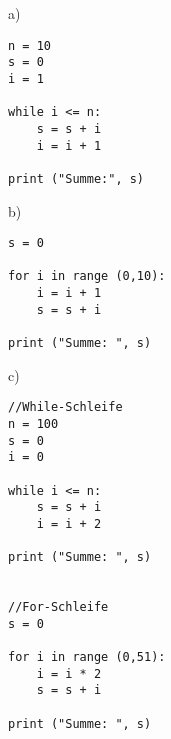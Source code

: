 a) \begin{lstlisting}[label=KontrollstrukturenSolutionA]
n = 10
s = 0
i = 1

while i <= n:
   	s = s + i
	i = i + 1

print ("Summe:", s)

\end{lstlisting} 

b) \begin{lstlisting}[label=KontrollstrukturenSolutionb]
s = 0

for i in range (0,10):
    i = i + 1
    s = s + i
    
print ("Summe: ", s)
\end{lstlisting} 

c) \begin{lstlisting}[label=KontrollstrukturenSolutionb]
//While-Schleife
n = 100
s = 0
i = 0

while i <= n:
    s = s + i
    i = i + 2
	
print ("Summe: ", s)

	
//For-Schleife
s = 0

for i in range (0,51):
    i = i * 2
    s = s + i
    
print ("Summe: ", s)
\end{lstlisting} 